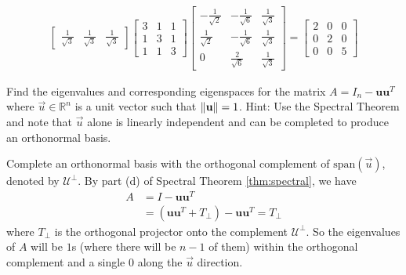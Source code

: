 \begin{Answer}
\begin{enumerate}[label=(\alph*)]
\begin{align*}
\begin{bmatrix}
\frac{1}{\sqrt{3}} & \frac{1}{\sqrt{3}} & \frac{1}{\sqrt{3}}
\end{bmatrix}
\begin{bmatrix}
3 & 1 & 1\\
1 & 3 & 1\\
1 & 1 & 3
\end{bmatrix}
\begin{bmatrix}
-\frac{1}{\sqrt{2}} & -\frac{1}{\sqrt{6}} & \frac{1}{\sqrt{3}}\\
\frac{1}{\sqrt{2}} & -\frac{1}{\sqrt{6}} & \frac{1}{\sqrt{3}}\\
0 & \frac{2}{\sqrt{6}} & \frac{1}{\sqrt{3}}
\end{bmatrix}
=
\begin{bmatrix}
2 & 0 & 0\\
0 & 2 & 0\\
0 & 0 & 5
\end{bmatrix}
\end{align*}
\end{enumerate}
\end{Answer}

\begin{Exercise}
Find the eigenvalues and corresponding eigenspaces for the matrix $A = I_n - \textbf{u}\textbf{u}^T$ where $\vec{u} \in \mathbb{R}^n$ is a unit vector such that $\norm{\textbf{u}} = 1$. Hint: Use the Spectral Theorem and note that $\vec{u}$ alone is linearly independent and can be completed to produce an orthonormal basis.
\end{Exercise}
\begin{Answer}
Complete an orthonormal basis with the orthogonal complement of $\text{span}(\vec{u})$, denoted by $\mathcal{U}^\perp$. By part (d) of Spectral Theorem \ref{thm:spectral}, we have 
\begin{align*}
A &= I - \textbf{u}\textbf{u}^T \\ 
&= (\textbf{u}\textbf{u}^T + T_{\perp}) - \textbf{u}\textbf{u}^T = T_{\perp}
\end{align*}
where $T_{\perp}$ is the orthogonal projector onto the complement $\mathcal{U}^\perp$. So the eigenvalues of $A$ will be $1$s (where there will be $n-1$ of them) within the orthogonal complement and a single $0$ along the $\vec{u}$ direction.
\end{Answer}

